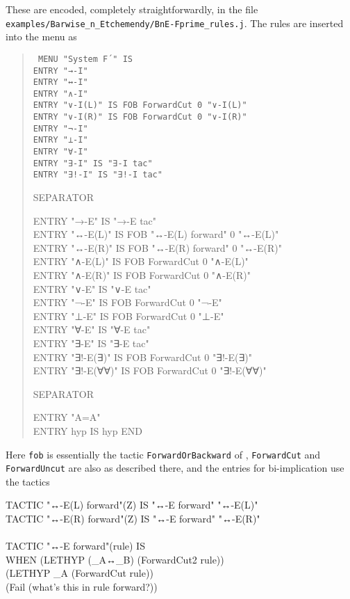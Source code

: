 These are encoded, completely straightforwardly, in the file \texttt{examples/Barwise\_n\_Etchemendy/BnE-Fprime\_rules.j}. The rules are inserted into the menu as
\begin{quote}\tt\small
MENU "System F´" IS\\
\tab ENTRY "→-I" \\
\tab ENTRY "↔-I"\\
\tab ENTRY "∧-I" \\
\tab ENTRY "∨-I(L)" IS FOB ForwardCut 0 "∨-I(L)"\\
\tab ENTRY "∨-I(R)" IS FOB ForwardCut 0 "∨-I(R)"\\
\tab ENTRY "¬-I"\\
\tab ENTRY "⊥-I"\\
\tab ENTRY "∀-I"\\
\tab ENTRY "∃-I" IS "∃-I tac"\\
\tab ENTRY "∃!-I" IS "∃!-I tac"

\tab SEPARATOR

\tab ENTRY "→-E"     IS "→-E tac" \\
\tab ENTRY "↔-E(L)"  IS FOB "↔-E(L) forward" 0 "↔-E(L)" \\
\tab ENTRY "↔-E(R)"  IS FOB "↔-E(R) forward" 0 "↔-E(R)" \\
\tab ENTRY "∧-E(L)"  IS FOB ForwardCut 0 "∧-E(L)"\\
\tab ENTRY "∧-E(R)"  IS FOB ForwardCut 0 "∧-E(R)"\\
\tab ENTRY "∨-E"     IS "∨-E tac"    \\
\tab ENTRY "¬-E"     IS FOB ForwardCut 0 "¬-E"   \\
\tab ENTRY "⊥-E"     IS FOB ForwardCut 0 "⊥-E"   \\
\tab ENTRY "∀-E"     IS "∀-E tac"    \\
\tab ENTRY "∃-E"     IS "∃-E tac"\\
\tab ENTRY "∃!-E(∃)" IS FOB ForwardCut 0 "∃!-E(∃)"\\
\tab ENTRY "∃!-E(∀∀)"    IS FOB ForwardCut 0 "∃!-E(∀∀)"

\tab SEPARATOR

\tab ENTRY "A=A"\\
\tab ENTRY hyp       IS hyp
END
\end{quote}

Here \texttt{fob} is essentially the tactic \texttt{ForwardOrBackward} of , \texttt{ForwardCut} and \texttt{ForwardUncut} are also as described there, and the entries for bi-implication use the tactics
\begin{japeish}
TACTIC "↔-E(L) forward"(Z) IS "↔-E forward" "↔-E(L)" \\
TACTIC "↔-E(R) forward"(Z) IS "↔-E forward" "↔-E(R)"\\
\\
TACTIC "↔-E forward"(rule) IS\\
\tab WHEN (LETHYP (\_A↔\_B) (ForwardCut2 rule))\\
\tab \tab (LETHYP \_A (ForwardCut rule))\\
\tab \tab (Fail (what's this in rule forward?))
\end{japeish}

